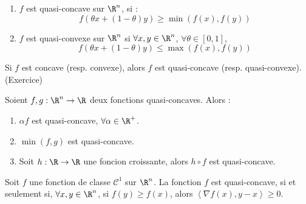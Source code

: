 \documentclass[12pt,a4paper]{article}
\begin{document}
	\begin{defi}
		\begin{minipage}[t]{15cm}
			\begin{enumerate}[label=\textbullet]
				\item  $f$ est quasi-concave sur $\R^n$, si :
				\begin{equation}
					f(\theta x+(1-\theta)y) \geq \min(f(x),f(y))
				\end{equation}
				
				\item  $f$ est quasi-convexe sur $\R^n$ si $\forall x,y\in \R^n$, $\forall \theta \in [0,1]$,
				\begin{equation}
					f(\theta x + (1-\theta) y) \leq \max(f(x),f(y))
				\end{equation}
			\end{enumerate}
		\end{minipage}
	\end{defi}
	
	\begin{rmq}
		\begin{minipage}[t]{15cm}
			Si $f$ est concave (resp. convexe), alors $f$ est quasi-concave (resp. quasi-convexe). (Exercice)
		\end{minipage}
	\end{rmq}
	
	\begin{lm}
		Soient $f,g : \R^n \to \R$ deux fonctions quasi-concaves. Alors :
		
		\begin{minipage}{17cm}
			\begin{enumerate}
				\item $\alpha f$ est quasi-concave, $\forall \alpha \in \R^+$.
				
				\item  $\min(f,g)$ est quasi-concave.
				
				\item Soit $h : \R \to \R$ une foncion croissante, alors $h\circ f$ est quasi-concave.
			\end{enumerate}
		\end{minipage}
	\end{lm}
	
	\begin{thm}
		\begin{minipage}[t]{15cm}
			Soit $f$ une fonction de classe $\mathcal C^1$ sur $\R^n$. La fonction $f$ est quasi-concave, si et seulement si, $\forall x,y \in \R^n$, si $f(y) \geq f(x)$, alors $\left<\nabla f(x),y-x\right> \geq 0$.
		\end{minipage}
	\end{thm}
	
\end{document}
